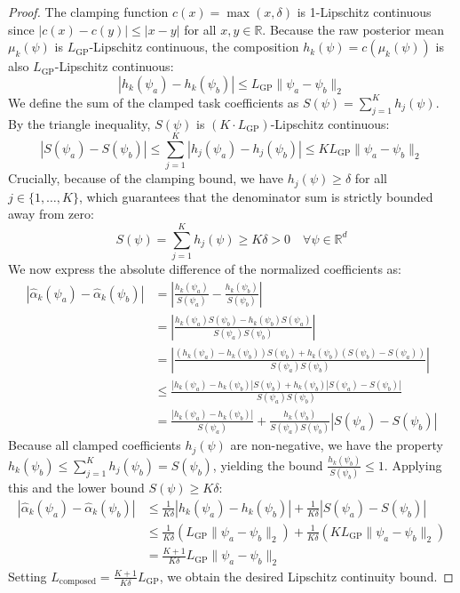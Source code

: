 \documentclass{article}
\theoremstyle{plain}
\theoremstyle{definition}
\theoremstyle{remark}
\begin{document}
\begin{proof}
The clamping function $c(x) = \max(x, \delta)$ is 1-Lipschitz continuous since $|c(x) - c(y)| \le |x - y|$ for all $x, y \in \mathbb{R}$. Because the raw posterior mean $\mu_k(\psi)$ is $L_{\text{GP}}$-Lipschitz continuous, the composition $h_k(\psi) = c(\mu_k(\psi))$ is also $L_{\text{GP}}$-Lipschitz continuous:
\begin{equation}
|h_k(\psi_a) - h_k(\psi_b)| \le L_{\text{GP}} \|\psi_a - \psi_b\|_2
\end{equation}
We define the sum of the clamped task coefficients as $S(\psi) = \sum_{j=1}^K h_j(\psi)$. By the triangle inequality, $S(\psi)$ is $(K \cdot L_{\text{GP}})$-Lipschitz continuous:
\begin{equation}
|S(\psi_a) - S(\psi_b)| \le \sum_{j=1}^K |h_j(\psi_a) - h_j(\psi_b)| \le K L_{\text{GP}} \|\psi_a - \psi_b\|_2
\end{equation}
Crucially, because of the clamping bound, we have $h_j(\psi) \ge \delta$ for all $j \in \{1,\dots,K\}$, which guarantees that the denominator sum is strictly bounded away from zero:
\begin{equation}
S(\psi) = \sum_{j=1}^K h_j(\psi) \ge K \delta > 0 \quad \forall \psi \in \mathbb{R}^d
\end{equation}
We now express the absolute difference of the normalized coefficients as:
\begin{align}
|\hat{\alpha}_k(\psi_a) - \hat{\alpha}_k(\psi_b)| &= \left| \frac{h_k(\psi_a)}{S(\psi_a)} - \frac{h_k(\psi_b)}{S(\psi_b)} \right| \nonumber \\
&= \left| \frac{h_k(\psi_a) S(\psi_b) - h_k(\psi_b) S(\psi_a)}{S(\psi_a) S(\psi_b)} \right| \nonumber \\
&= \left| \frac{(h_k(\psi_a) - h_k(\psi_b)) S(\psi_b) + h_k(\psi_b) (S(\psi_b) - S(\psi_a))}{S(\psi_a) S(\psi_b)} \right| \nonumber \\
&\le \frac{|h_k(\psi_a) - h_k(\psi_b)| S(\psi_b) + h_k(\psi_b) |S(\psi_a) - S(\psi_b)|}{S(\psi_a) S(\psi_b)} \nonumber \\
&= \frac{|h_k(\psi_a) - h_k(\psi_b)|}{S(\psi_a)} + \frac{h_k(\psi_b)}{S(\psi_a) S(\psi_b)} |S(\psi_a) - S(\psi_b)|
\end{align}
Because all clamped coefficients $h_j(\psi)$ are non-negative, we have the property $h_k(\psi_b) \le \sum_{j=1}^K h_j(\psi_b) = S(\psi_b)$, yielding the bound $\frac{h_k(\psi_b)}{S(\psi_b)} \le 1$. Applying this and the lower bound $S(\psi) \ge K \delta$:
\begin{align}
|\hat{\alpha}_k(\psi_a) - \hat{\alpha}_k(\psi_b)| &\le \frac{1}{K \delta} |h_k(\psi_a) - h_k(\psi_b)| + \frac{1}{K \delta} |S(\psi_a) - S(\psi_b)| \nonumber \\
&\le \frac{1}{K \delta} \left( L_{\text{GP}} \|\psi_a - \psi_b\|_2 \right) + \frac{1}{K \delta} \left( K L_{\text{GP}} \|\psi_a - \psi_b\|_2 \right) \nonumber \\
&= \frac{K+1}{K \delta} L_{\text{GP}} \|\psi_a - \psi_b\|_2
\end{align}
Setting $L_{\text{composed}} = \frac{K+1}{K \delta} L_{\text{GP}}$, we obtain the desired Lipschitz continuity bound.
\end{proof}
\end{document}
